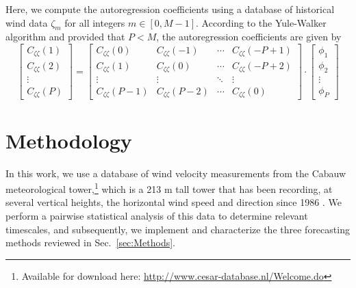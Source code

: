 \documentclass[11pt, oneside]{article}
\newcommand{\secref}[1]{Sec.~\ref{#1}}
\begin{document}
Here, we compute the autoregression coefficients using a database of historical wind data $\zeta_m$ for all integers $m \in [0, M-1]$.
According to the Yule-Walker algorithm and provided that $P < M$, the autoregression coefficients are given by
\begin{equation}
\begin{bmatrix}
C_{\zeta \zeta}(1) \\
C_{\zeta \zeta}(2) \\
\vdots \\
C_{\zeta \zeta}(P)
\end{bmatrix}
=
\begin{bmatrix}
C_{\zeta \zeta}(0) & C_{\zeta \zeta}(-1) & \cdots & C_{\zeta \zeta} (-P+1) \\
C_{\zeta \zeta}(1) & C_{\zeta \zeta}(0) & \cdots & C_{\zeta \zeta} (-P+2) \\
\vdots & \vdots & \ddots & \vdots \\
C_{\zeta \zeta}(P-1) & C_{\zeta \zeta}(P-2) & \cdots & C_{\zeta \zeta}(0)
\end{bmatrix}
\cdot
\begin{bmatrix}
\phi_1 \\
\phi_2 \\
\vdots \\
\phi_P
\end{bmatrix}
\end{equation}

\section{Methodology}\label{sec:Methodology}
In this work, we use a database of wind velocity measurements from the Cabauw meteorological tower,\footnote{Available for download here: \url{http://www.cesar-database.nl/Welcome.do}} which is a 213 m tall tower that has been recording, at several vertical heights, the horizontal wind speed and direction since 1986 \citep[Table I]{VanUldenWieringa1996}.
We perform a pairwise statistical analysis of this data to determine relevant timescales, and
subsequently, we implement and characterize the three forecasting methods reviewed in \secref{sec:Methods}.
\end{document}
